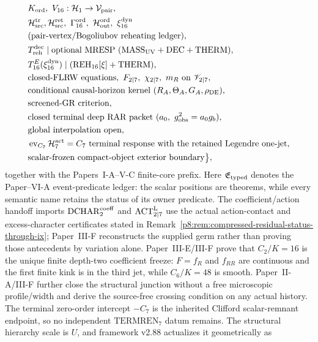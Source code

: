 \documentclass[12pt,a4paper]{article}
\begin{document}
{\begin{align}
&K_{\rm ord},\ V_{16}:\mathcal H_1\to\mathcal V_{\rm pair},\notag\\
&\mathcal H_{\rm src}^{\rm tr},\mathcal H_{\rm src}^{\rm ret},\
  \Gamma_{16}^{\rm ord},\ \mathcal H_{\rm out}^{\rm ord},\ \xi_{16}^{\rm dyn}\notag\\
&\text{(pair-vertex/Bogoliubov reheating ledger)},\notag\\
&T_{\rm reh}^{\rm dec}\mid
  \text{optional MRESP }(\mathrm{MASS}_{\rm UV}+\mathrm{DEC}+\mathrm{THERM}),\notag\\
&T_{16}^{E}(\xi_{16}^{\rm dyn})\mid(\mathrm{REH}_{16}[\xi]+\mathrm{THERM}),\notag\\
&\text{closed-FLRW equations},\ F_{2\mid7},\ \chi_{2\mid7},\ m_R
  \text{ on }\mathscr V_{2\mid7},\notag\\
&\text{conditional causal-horizon kernel }(R_A,\Theta_A,G_A,\rho_{\rm DE}),\notag\\
&\text{screened-GR criterion},\notag\\
&\text{closed terminal deep RAR packet }(a_0,\ g_{\rm obs}^2=a_0g_b),\notag\\
&\text{global interpolation open},\notag\\
&\operatorname{ev}_{C_7}\mathcal H_7^{\rm act}=C_7
  \text{ terminal response with the retained Legendre one-jet},\notag\\
&\text{scalar-frozen compact-object exterior boundary}\bigr\},
\label{p9:eq:second-import-packet}
\end{align}
}
together with the Papers~I-A--V-C finite-core prefix.  Here
\(\mathfrak E_{\rm typed}\) denotes the Paper--VI-A event-predicate ledger:
the scalar positions are theorems, while every semantic name retains the
status of its owner predicate.  The coefficient/action handoff imports
\(\mathrm{DCHAR}_{2}^{\rm coeff}\) and
\(\mathrm{ACT}_{2\mid7}^{\rm L}\) use the actual action-contact and
excess-character certificates stated in
Remark~\ref{p8:rem:compressed-residual-status-through-ix}; Paper~III-F
reconstructs the supplied germ rather than proving those antecedents by
variation alone.
Paper~III-E/III-F prove that $C_2/K=16$ is the unique finite depth-two coefficient freeze: $F=f_R$ and $f_{RR}$ are continuous and the first finite kink is in the third jet, while $C_6/K=48$ is smooth.  Paper~II-A/III-F further
close the structural junction without a free microscopic profile/width and
derive the source-free crossing condition on any actual history.  The terminal
zero-order intercept \(-C_7\) is the inherited Clifford scalar-remnant
endpoint, so no independent \(\mathrm{TERMREN}_7\) datum remains.  The structural hierarchy scale is \(U\), and framework v2.88 actualizes it geometrically as
\end{document}
